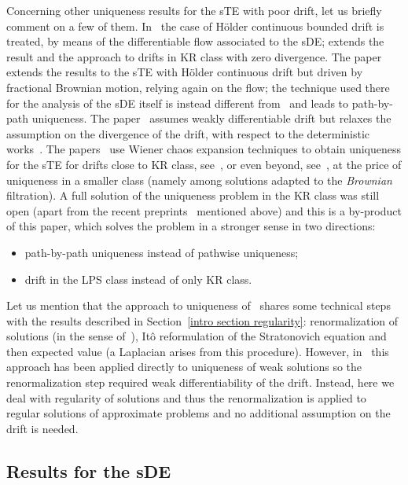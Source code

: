 \documentclass[a4paper,10pt]{article}
\newcommand\1{\mathbbm{1}}
\numberwithin{equation}{section}
\begin{document}
Concerning other uniqueness results for the sTE with poor drift, let us briefly comment on a few of them. In~\cite{FLAGUBPRI10} the case of H\"{o}lder continuous bounded drift is treated, by means of the differentiable flow associated to the sDE; \cite{NevOli} extends the result and the approach to drifts in KR class with zero divergence. The paper~\cite{Cat} extends the results to the sTE with H\"older continuous drift but driven by fractional Brownian motion, relying again on the flow; the technique used there for the analysis of the sDE itself is instead different from~\cite{FLAGUBPRI10} and leads to path-by-path uniqueness. The paper~\cite{AtFl} assumes weakly differentiable drift but relaxes the assumption on the divergence of the drift, with respect to the deterministic works~\cite{DIPELI89,AMBROSIO04}. The papers~\cite{Ma,FedNevOli} use Wiener chaos expansion techniques to obtain uniqueness for the sTE for drifts close to KR class, see~\cite{Ma}, or even beyond, see~\cite{FedNevOli}, at the price of uniqueness in a smaller class (namely among solutions adapted to the \textit{Brownian} filtration). A full solution of the uniqueness problem in the KR class was still open (apart from the recent preprints~\cite{Nam,WLW} mentioned above) and this is a by-product of this paper, which solves the problem in a stronger sense in two directions:
\begin{itemize}
\item[i)] path-by-path uniqueness instead of pathwise uniqueness;
\item[ii)] drift in the LPS class instead of only KR class.
\end{itemize}
Let us mention that the approach to uniqueness of~\cite{AtFl} shares some technical steps with the results described in Section~\ref{intro section regularity}: renormalization of solutions (in the sense of~\cite{DIPELI89}), It\^{o} reformulation of the Stratonovich equation and then expected value (a Laplacian arises from this procedure). However, in~\cite{AtFl} this approach has been applied directly to uniqueness of weak solutions so the renormalization step required weak differentiability of the drift. Instead, here we deal with regularity of solutions and thus the renormalization is applied to regular solutions of approximate problems and no additional assumption on the drift is needed.

\subsection{Results for the sDE\label{intro section SDE}}
\end{document}
